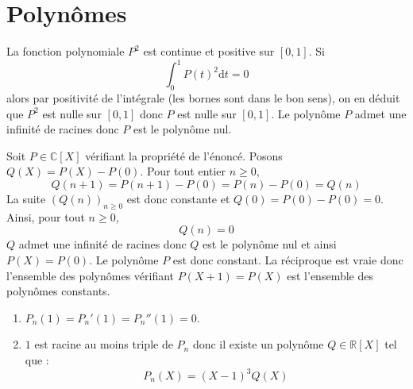 \documentclass[a4paper,twoside,french,11pt]{VcCours}
\newcommand{\dt}{\text{d}t}
\begin{document}
\section{Polynômes}


\begin{Exercice}{}\end{Exercice}La fonction polynomiale $P^2$ est continue et positive sur $[0,1]$. Si 
$$ \int_0^1 P(t)^2 \dt = 0 $$
alors par positivité de l'intégrale (les bornes sont dans le bon sens), on en déduit que $P^2$ est nulle sur $[0,1]$ donc $P$ est nulle sur $[0,1]$. Le polynôme $P$ admet une infinité de racines donc $P$ est le polynôme nul.


\begin{Exercice}{}\end{Exercice}Soit $P \in \mathbb{C}[X]$ vérifiant la propriété de l'énoncé. Posons $Q(X)=P(X)-P(0)$. Pour tout entier $n \geq 0$,
$$ Q(n+1) = P(n+1)-P(0)=P(n)-P(0)= Q(n)$$
La suite $(Q(n))_{n \geq 0}$ est donc constante et $Q(0)=P(0)-P(0)=0$. Ainsi, pour tout $n \geq 0$,
$$ Q(n)=0$$
$Q$ admet une infinité de racines donc $Q$ est le polynôme nul et ainsi $P(X)=P(0)$. Le polynôme $P$ est donc constant. La réciproque est vraie donc l'ensemble des polynômes vérifiant $P(X+1)=P(X)$ est l'ensemble des polynômes constants.



\begin{Exercice}{}\end{Exercice}
\begin{enumerate}
\item $P_n(1) = P_n'(1) =P_n''(1)=0$.
\item $1$ est racine au moins triple de $P_n$ donc il existe un polynôme $Q \in \mathbb{R}[X]$ tel que :
$$ P_n(X)=(X-1)^3 Q(X)$$
\end{enumerate}


\begin{Exercice}{}\end{Exercice}
\end{document}
